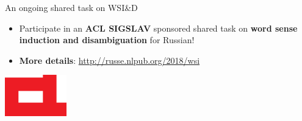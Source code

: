 \documentclass[usenames,dvipsnames]{beamer}
\begin{document}
\begin{frame}{An ongoing shared task on WSI\&D}
  
  \begin{itemize}
  \item Participate in an \textbf{\alert{ACL SIGSLAV}} sponsored shared task on \textbf{word sense induction and disambiguation} for Russian!
 \end{itemize} 
  
%  
  \begin{itemize}
    \item \textbf{More details}: \url{http://russe.nlpub.org/2018/wsi}
     
  \end{itemize}
  
  \begin{center}
  	\includegraphics[width=0.2\textwidth]{acl}
  \end{center}
\end{frame}
\end{document}
